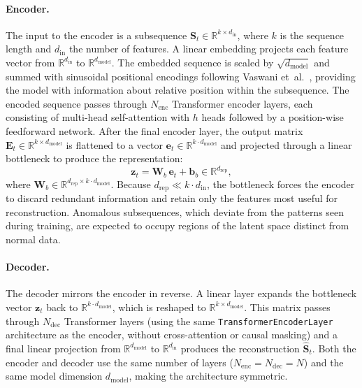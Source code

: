 \documentclass[11pt]{report}
\begin{document}
\paragraph{Encoder.}
The input to the encoder is a subsequence $\mathbf{S}_t \in \mathbb{R}^{k \times d_{\text{in}}}$, where $k$ is the sequence length and $d_{\text{in}}$ the number of features. A linear embedding projects each feature vector from $\mathbb{R}^{d_{\text{in}}}$ to $\mathbb{R}^{d_{\text{model}}}$. The embedded sequence is scaled by $\sqrt{d_{\text{model}}}$ and summed with sinusoidal positional encodings following Vaswani et~al.~\cite{vaswani2017attention}, providing the model with information about relative position within the subsequence. The encoded sequence passes through $N_{\text{enc}}$ Transformer encoder layers, each consisting of multi-head self-attention with $h$ heads followed by a position-wise feedforward network. After the final encoder layer, the output matrix $\mathbf{E}_t \in \mathbb{R}^{k \times d_{\text{model}}}$ is flattened to a vector $\mathbf{e}_t \in \mathbb{R}^{k \cdot d_{\text{model}}}$ and projected through a linear bottleneck to produce the representation:
\begin{equation}
  \label{eq:bottleneck}
  \mathbf{z}_t = \mathbf{W}_b \, \mathbf{e}_t + \mathbf{b}_b \in \mathbb{R}^{d_{\text{rep}}},
\end{equation}
where $\mathbf{W}_b \in \mathbb{R}^{d_{\text{rep}} \times k \cdot d_{\text{model}}}$. Because $d_{\text{rep}} \ll k \cdot d_{\text{in}}$, the bottleneck forces the encoder to discard redundant information and retain only the features most useful for reconstruction. Anomalous subsequences, which deviate from the patterns seen during training, are expected to occupy regions of the latent space distinct from normal data.

\paragraph{Decoder.}
The decoder mirrors the encoder in reverse. A linear layer expands the bottleneck vector $\mathbf{z}_t$ back to $\mathbb{R}^{k \cdot d_{\text{model}}}$, which is reshaped to $\mathbb{R}^{k \times d_{\text{model}}}$. This matrix passes through $N_{\text{dec}}$ Transformer layers (using the same \texttt{TransformerEncoderLayer} architecture as the encoder, without cross-attention or causal masking) and a final linear projection from $\mathbb{R}^{d_{\text{model}}}$ to $\mathbb{R}^{d_{\text{in}}}$ produces the reconstruction $\hat{\mathbf{S}}_t$. Both the encoder and decoder use the same number of layers ($N_{\text{enc}} = N_{\text{dec}} = N$) and the same model dimension $d_{\text{model}}$, making the architecture symmetric.
\end{document}
